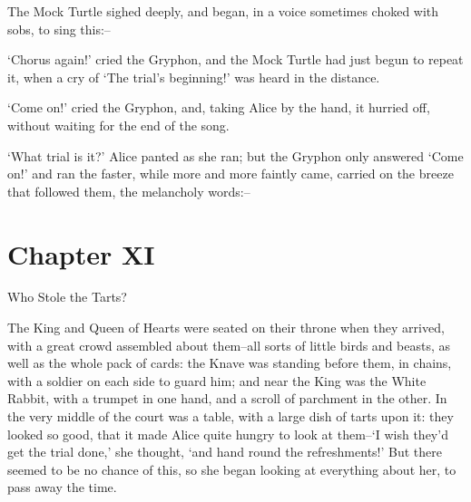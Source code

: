   The Mock Turtle sighed deeply, and began, in a voice sometimes
choked with sobs, to sing this:--

\onelineskip
{}
\onelineskip

\onelineskip

  `Chorus again!' cried the Gryphon, and the Mock Turtle had
just begun to repeat it, when a cry of `The trial's beginning!'
was heard in the distance.

  `Come on!' cried the Gryphon, and, taking Alice by the hand,
it hurried off, without waiting for the end of the song.

  `What trial is it?' Alice panted as she ran; but the Gryphon
only answered `Come on!' and ran the faster, while more and more
faintly came, carried on the breeze that followed them, the
melancholy words:--
\onelineskip
{}



\chapter{Chapter XI}{Who Stole the Tarts?}


  The King and Queen of Hearts were seated on their throne when
they arrived, with a great crowd assembled about them--all sorts
of little birds and beasts, as well as the whole pack of cards:
the Knave was standing before them, in chains, with a soldier on
each side to guard him; and near the King was the White Rabbit,
with a trumpet in one hand, and a scroll of parchment in the
other.  In the very middle of the court was a table, with a large
dish of tarts upon it:  they looked so good, that it made Alice
quite hungry to look at them--`I wish they'd get the trial done,'
she thought, `and hand round the refreshments!'  But there seemed
to be no chance of this, so she began looking at everything about
her, to pass away the time.

